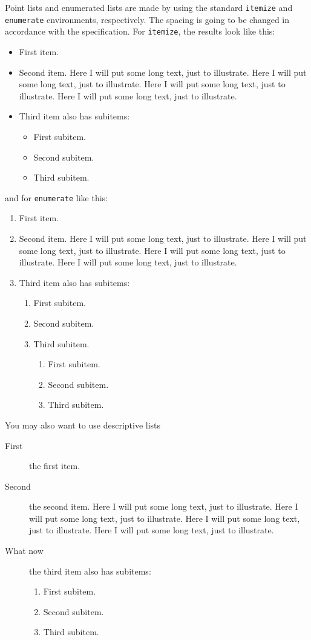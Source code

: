 Point lists and enumerated lists are made by using the standard
\texttt{itemize} and \texttt{enumerate} environments, respectively.
The spacing is going to be changed in accordance with the specification. For
\texttt{itemize}, the results look like this:
\begin{itemize}
	\item First item.
	\item Second item. Here I will put some long text, just to illustrate.
	  Here I will put some long text, just to illustrate. Here I will put
	  some long text, just to illustrate. Here I will put some long text,
	  just to illustrate.
	\item Third item also has subitems:
	  \begin{itemize}
		  \item First subitem.
		  \item Second subitem.
		  \item Third subitem.
			  \end{itemize}
\end{itemize}
and for \texttt{enumerate} like this:
\begin{enumerate}
	\item First item.
	\item Second item. Here I will put some long text, just to illustrate.
	  Here I will put some long text, just to illustrate. Here I will put
	  some long text, just to illustrate. Here I will put some long text,
	  just to illustrate.
	\item Third item also has subitems:
	  \begin{enumerate}
		  \item First subitem.
		  \item Second subitem.
		  \item Third subitem.	  
			\begin{enumerate}
		  \item First subitem.
		  \item Second subitem.
		  \item Third subitem.
	  \end{enumerate}
	  \end{enumerate}
\end{enumerate}

You may also want to use descriptive lists
\begin{description}
	\item[First] the first item.
	\item[Second] the second item. Here I will put some long text, just to illustrate.
	  Here I will put some long text, just to illustrate. Here I will put
	  some long text, just to illustrate. Here I will put some long text,
	  just to illustrate.
	\item [What now] the third item also has subitems:
	  \begin{enumerate}
		  \item First subitem.
		  \item Second subitem.
		  \item Third subitem.
	  \end{enumerate}
\end{description}


